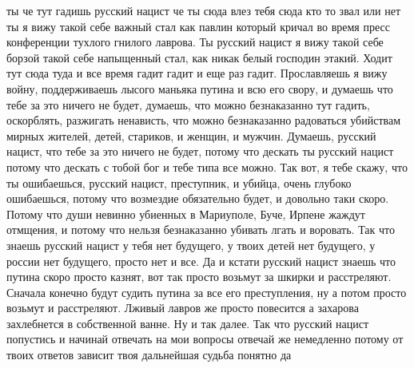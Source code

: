 ты че тут гадишь русский нацист че ты сюда влез тебя сюда кто то звал или нет
ты я вижу такой себе важный стал как павлин который кричал во время пресс
конференции тухлого гнилого лаврова. Ты русский нацист я вижу такой себе борзой
такой себе напыщенный стал, как никак белый господин этакий. Ходит тут сюда
туда и все время гадит гадит и еще раз гадит. Прославляешь я вижу войну,
поддерживаешь лысого маньяка путина и всю его свору, и думаешь что тебе за это
ничего не будет, думаешь, что можно безнаказанно тут гадить, оскорблять,
разжигать ненависть, что можно безнаказанно радоваться убийствам мирных
жителей, детей, стариков, и женщин, и мужчин. Думаешь, русский нацист, что тебе
за это ничего не будет, потому что дескать ты русский нацист потому что дескать
с тобой бог и тебе типа все можно. Так вот, я тебе скажу, что ты ошибаешься,
русский нацист, преступник, и убийца, очень глубоко ошибаешься, потому что
возмездие обязательно будет, и довольно таки скоро. Потому что души невинно
убиенных в Мариуполе, Буче, Ирпене жаждут отмщения, и потому что нельзя
безнаказанно убивать лгать и воровать. Так что знаешь русский нацист у тебя нет
будущего, у твоих детей нет будущего, у россии нет будущего, просто нет и все.
Да и кстати русский нацист знаешь что путина скоро просто казнят, вот так
просто возьмут за шкирки и расстреляют. Сначала конечно будут судить путина за
все его преступления, ну а потом просто возьмут и расстреляют. Лживый лавров же
просто повесится а захарова захлебнется в собственной ванне. Ну и так далее.
Так что русский нацист попустись и начинай отвечать на мои вопросы отвечай же
немедленно потому от твоих ответов зависит твоя дальнейшая судьба понятно да

